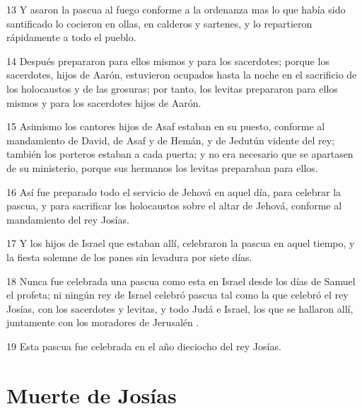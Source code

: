 \par 13 Y asaron la pascua al fuego conforme a la ordenanza  mas lo que había sido santificado lo cocieron en ollas, en calderos y sartenes, y lo repartieron rápidamente a todo el pueblo.
\par 14 Después prepararon para ellos mismos y para los sacerdotes; porque los sacerdotes, hijos de Aarón, estuvieron ocupados hasta la noche en el sacrificio de los holocaustos y de las grosuras; por tanto, los levitas prepararon para ellos mismos y para los sacerdotes hijos de Aarón.
\par 15 Asimismo los cantores hijos de Asaf estaban en su puesto, conforme al mandamiento de David, de Asaf y de Hemán, y de Jedutún vidente del rey; también los porteros estaban a cada puerta; y no era necesario que se apartasen de su ministerio, porque sus hermanos los levitas preparaban para ellos.
\par 16 Así fue preparado todo el servicio de Jehová en aquel día, para celebrar la pascua, y para sacrificar los holocaustos sobre el altar de Jehová, conforme al mandamiento del rey Josías.
\par 17 Y los hijos de Israel que estaban allí, celebraron la pascua en aquel tiempo, y la fiesta solemne de los panes sin levadura por siete días. 
\par 18 Nunca fue celebrada una pascua como esta en Israel desde los días de Samuel el profeta; ni ningún rey de Israel celebró pascua tal como la que celebró el rey Josías, con los sacerdotes y levitas, y todo Judá e Israel, los que se hallaron allí, juntamente con los moradores de Jerusalén .
\par 19 Esta pascua fue celebrada en el año dieciocho del rey Josías.

\section*{Muerte de Josías}

